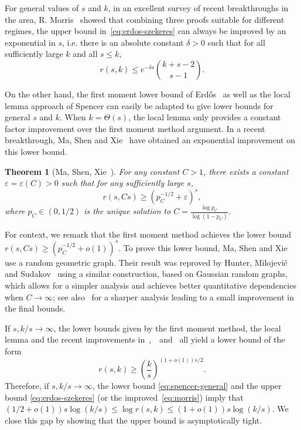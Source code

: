 \documentclass{article}
\theoremstyle{plain}
\newtheorem{theorem}{Theorem}[section]
\theoremstyle{definition}
\def\eps {\varepsilon}
\begin{document}
For general values of $s$ and $k$, in an excellent survey of recent breakthroughs in the area, R. Morris~\cite{morris-survey} showed that combining three proofs suitable for different regimes, the upper bound in~\eqref{eq:erdos-szekeres} can always be improved by an exponential in $s$, i.e. there is an absolute constant $\delta > 0$ such that for all sufficiently large $k$ and all $s \le k,$
\begin{equation} \label{eq:morris}
    r(s, k) \le e^{-\delta s} \binom{k+s-2}{s-1}.
\end{equation}

On the other hand, the first moment lower bound of Erd\H{o}s~\cite{erdos-lb} as well as the local lemma approach of Spencer can easily be adapted to give lower bounds for general $s$ and $k$. When $k = \Theta(s)$, the local lemma only provides a constant factor improvement over the first moment method argument. In a recent breakthrough, Ma, Shen and Xie~\cite{ma-shen-xie} have obtained an exponential improvement on this lower bound.

\begin{theorem}[Ma, Shen, Xie~\cite{ma-shen-xie}] \label{thm:ma-shen-xie}
    For any constant $C > 1$, there exists a constant $\eps = \eps(C) > 0$ such that for any sufficiently large $s$,
    \[ r(s, Cs) \ge (p_C^{-1/2} + \eps)^s, \]
    where $p_C \in (0, 1/2)$ is the unique solution to $C  = \frac{\log p_C}{\log (1 - p_C)}$.
\end{theorem}

For context, we remark that the first moment method achieves the lower bound $r(s, Cs) \ge (p_C^{-1/2} + o(1))^s$. To prove this lower bound, Ma, Shen and Xie use a random geometric graph. Their result was reproved by Hunter, Milojevi\'{c} and Sudakov~\cite{hunter-milojevic-sudakov} using a similar construction, based on Gaussian random graphs, which allows for a simpler analysis and achieves better quantitative dependencies when $C \rightarrow \infty$; see also~\cite{lin-niu} for a sharper analysis leading to a small improvement in the final bounds.

If $s, k/s \rightarrow \infty$, the lower bounds given by the first moment method, the local lemma and the recent improvements in~\cite{ma-shen-xie},~\cite{hunter-milojevic-sudakov}~and~\cite{lin-niu} all yield a lower bound of the form
\begin{equation} \label{eq:spencer-general}
    r(s, k) \ge \left( \frac{k}{s} \right)^{(1 + o(1))s/2}.
\end{equation}
Therefore, if $s, k/s \rightarrow \infty$, the lower bound \eqref{eq:spencer-general} and the upper bound \eqref{eq:erdos-szekeres} (or the improved~\eqref{eq:morris}) imply that\linebreak $(1 / 2 + o(1)) s \log(k/s) \le \log r(s, k) \le (1 + o(1)) s \log(k/s)$. We close this gap by showing that the upper bound is asymptotically tight.
\end{document}
